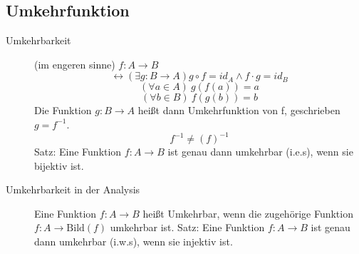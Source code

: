 \subsection{Umkehrfunktion}
\begin{description}
    \item[Umkehrbarkeit] (im engeren sinne) $f : A \longrightarrow B$
    $$\leftrightarrow (\exists g : B \longrightarrow A) g \circ f = id_A \wedge f \cdot g = id_B$$
    $$(\forall a \in A)\ g(f(a)) = a$$
    $$(\forall b \in B)\ f(g(b)) = b$$
    Die Funktion $g : B \longrightarrow A$ heißt dann Umkehrfunktion von f, geschrieben $g = f^{-1}$.
    $$f^{-1} \not = (f)^{-1}$$
    Satz: Eine Funktion $f : A \longrightarrow B$ ist genau dann umkehrbar (i.e.s), wenn sie bijektiv ist.
    \item[Umkehrbarkeit in der Analysis] Eine Funktion $f : A \longrightarrow B$ heißt Umkehrbar, wenn die zugehörige Funktion $f : A \longrightarrow \textrm{Bild}(f)$ umkehrbar ist.
    Satz: Eine Funktion $f : A \longrightarrow B$ ist genau dann umkehrbar (i.w.s), wenn sie injektiv ist.
\end{description}
